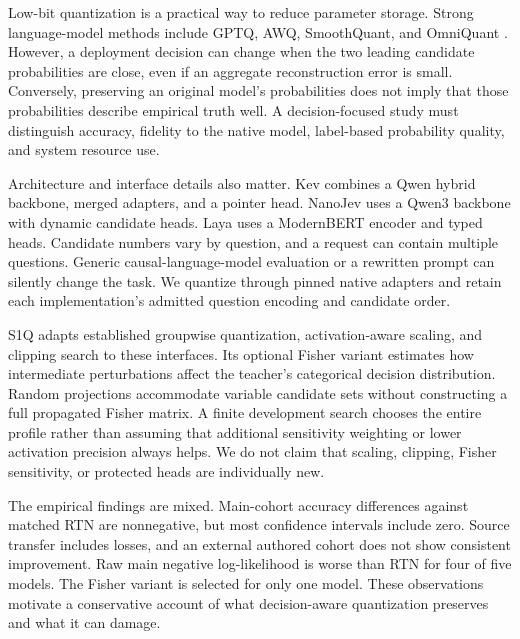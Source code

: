 \documentclass[10pt,twocolumn]{article}
\begin{document}
Low-bit quantization is a practical way to reduce parameter storage.
Strong language-model methods include GPTQ, AWQ, SmoothQuant, and
OmniQuant \cite{frantar2023gptq,lin2024awq,xiao2023smoothquant,shao2024omniquant}.
However, a deployment decision can change when the two leading candidate
probabilities are close, even if an aggregate reconstruction error is small.
Conversely, preserving an original model's probabilities does not imply
that those probabilities describe empirical truth well. A decision-focused
study must distinguish accuracy, fidelity to the native model, label-based
probability quality, and system resource use.

Architecture and interface details also matter. Kev combines a Qwen
hybrid backbone, merged adapters, and a pointer head. NanoJev uses a
Qwen3 backbone with dynamic candidate heads. Laya uses a ModernBERT
encoder and typed heads. Candidate numbers vary by question, and a
request can contain multiple questions. Generic causal-language-model
evaluation or a rewritten prompt can silently change the task.
We quantize through pinned native adapters and retain each
implementation's admitted question encoding and candidate order.

S1Q adapts established groupwise quantization, activation-aware scaling,
and clipping search to these interfaces. Its optional Fisher variant
estimates how intermediate perturbations affect the teacher's categorical
decision distribution. Random projections accommodate variable candidate
sets without constructing a full propagated Fisher matrix. A finite
development search chooses the entire profile rather than assuming
that additional sensitivity weighting or lower activation precision always
helps. We do not claim that scaling, clipping, Fisher sensitivity, or
protected heads are individually new.

The empirical findings are mixed. Main-cohort accuracy differences against
matched RTN are nonnegative, but most confidence intervals include zero.
Source transfer includes losses, and an external authored cohort does not
show consistent improvement. Raw main negative log-likelihood is worse
than RTN for four of five models. The Fisher variant is selected for only
one model. These observations motivate a conservative account of what
decision-aware quantization preserves and what it can damage.
\end{document}
